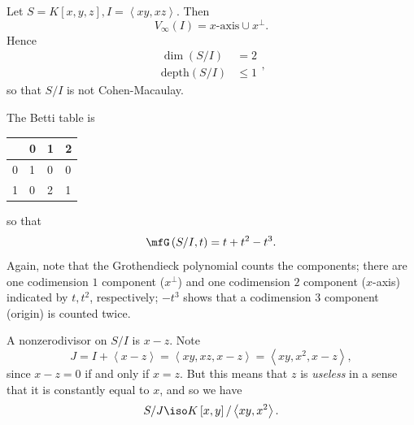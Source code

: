 \documentclass[co439]{subfiles}
\begin{document}
    \begin{example}{}
        Let $S=K\left[ x,y,z \right], I = \left< xy,xz \right>$. Then
        \begin{equation*}
            V_{\infty}\left( I \right) = \text{$x$-axis} \cup x^{\perp}.
        \end{equation*}
        Hence
        \begin{equation*}
            \begin{aligned}
                \dim\left( S /I \right) & = 2 \\
                \text{depth}\left( S /I \right) & \leq 1
            \end{aligned} ,
        \end{equation*}
        so that $S /I$ is not Cohen-Macaulay.

        The Betti table is

        \begin{center}
            \begin{tabularx}{6cm}{|X|XXX|}
                  \hline
                  & 0 & 1 & 2 \\
                  \hline
                0 & 1 & 0 & 0 \\
                1 & 0 & 2 & 1 \\
                  \hline
            \end{tabularx}
        \end{center}

        so that
        \begin{equation*}
            \mfG\left( S /I,t \right) = t+t^{2}-t^{3}.
        \end{equation*}
        Again, note that the Grothendieck polynomial counts the components; there are one codimension $1$ component ($x^{\perp}$) and one codimension $2$ component ($x$-axis) indicated by $t, t^{2}$, respectively; $-t^{3}$ shows that a codimension $3$ component (origin) is counted twice.

        A nonzerodivisor on $S /I$ is $x-z$. Note
        \begin{equation*}
            J = I + \left< x-z \right> = \left< xy,xz,x-z \right> = \left< xy,x^{2},x-z \right> ,
        \end{equation*}
        since $x-z = 0$ if and only if $x=z$. But this means that $z$ is \textit{useless} in a sense that it is constantly equal to $x$, and so we have
        \begin{equation*}
            S /J \iso K\left[ x,y \right] / \left< xy,x^{2} \right>. 
        \end{equation*}
    \end{example}
\end{document}
